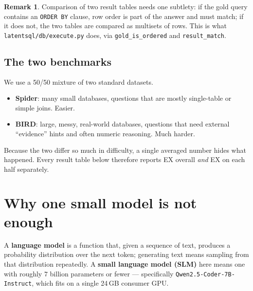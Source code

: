 \documentclass[11pt]{article}
\theoremstyle{definition}
\newtheorem{remark}[theorem]{Remark}
\begin{document}
\begin{remark}
Comparison of two result tables needs one subtlety: if the gold query contains an \texttt{ORDER BY} clause, row order is part of the answer and must match; if it does not, the two tables are compared as multisets of rows. This is what \texttt{latentsql/db/execute.py} does, via \texttt{gold\_is\_ordered} and \texttt{result\_match}.
\end{remark}

\begin{center}
\end{center}

\subsection{The two benchmarks}

We use a 50/50 mixture of two standard datasets.

\begin{itemize}
\item \textbf{Spider}: many small databases, questions that are mostly single-table or simple joins. Easier.
\item \textbf{BIRD}: large, messy, real-world databases, questions that need external ``evidence'' hints and often numeric reasoning. Much harder.
\end{itemize}

Because the two differ so much in difficulty, a single averaged number hides what happened. Every result table below therefore reports EX overall \emph{and} EX on each half separately.

\section{Why one small model is not enough}

A \textbf{language model} is a function that, given a sequence of text, produces a probability distribution over the next token; generating text means sampling from that distribution repeatedly. A \textbf{small language model (SLM)} here means one with roughly $7$ billion parameters or fewer --- specifically \texttt{Qwen2.5-Coder-7B-Instruct}, which fits on a single 24\,GB consumer GPU.
\end{document}
